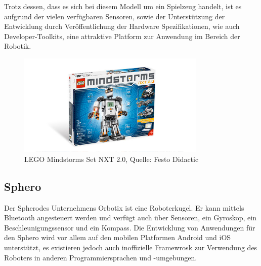 Trotz dessen, dass es sich bei diesem Modell um ein Spielzeug handelt, ist es aufgrund der vielen verf\"ugbaren Sensoren, sowie der Unterst\"utzung der Entwicklung durch Ver\"offentlichung der Hardware Spezifikationen, wie auch Developer-Toolkits, eine attraktive Platform zur Anwendung im Bereich der Robotik.  

\begin{figure}[H]
\includegraphics[width=0.8\textwidth]{img/nxt/download8BECFDA0517A505735D8E38A0137B963.jpg}
\caption[LEGO Mindstorms Set NXT 2.0]{LEGO Mindstorms Set NXT 2.0, Quelle: Festo Didactic\footnotemark[17]}
\label{fig:nxt_fig}
\end{figure}

\clearpage

\subsection{Sphero}

Der Sphero\footnotemark[18] des Unternehmens Orbotix ist eine Roboterkugel. Er kann mittels Bluetooth angesteuert werden und verf\"ugt auch \"uber Sensoren, ein Gyroskop, ein Beschleunigungssensor und ein Kompass\footnotemark[19]. Die Entwicklung von Anwendungen f\"ur den Sphero wird vor allem auf den mobilen Platformen Android und iOS unterst\"utzt, es existieren jedoch auch inoffizielle Framewrosk zur Verwendung des Roboters in anderen Programmiersprachen und -umgebungen.


